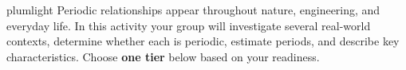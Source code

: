 \documentclass[10pt]{article}
\begin{document}
\namepartnerperiod

\vspace{0.10in}

\begin{scenariobox}{plumlight}
Periodic relationships appear throughout nature, engineering, and everyday
life. In this activity your group will investigate several real-world
contexts, determine whether each is periodic, estimate periods, and describe
key characteristics. Choose \textbf{one tier} below based on your readiness.
\end{scenariobox}

\vspace{0.08in}

\end{document}
